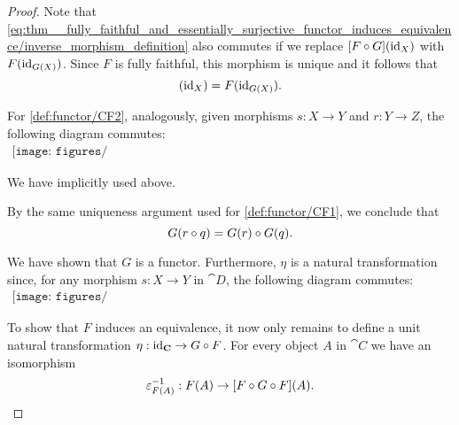 \begin{proof}
  Note that \eqref{eq:thm__fully_faithful_and_essentially_surjective_functor_induces_equivalence/inverse_morphism_definition} also commutes if we replace \( [F \bincirc G](\id_X) \) with \( F(\operatorname{id}_{G(X)}) \). Since \( F \) is fully faithful, this morphism is unique and it follows that
  \begin{equation*}
    [F \bincirc G](\id_X) = F(\id_{G(X)}).
  \end{equation*}

  For \ref{def:functor/CF2}, analogously, given morphisms \( s: X \to Y \) and \( r: Y \to Z \), the following diagram commutes:
  \begin{equation}\label{eq:thm__fully_faithful_and_essentially_surjective_functor_induces_equivalence/composition}
    \begin{aligned}
      \texttt{[image: figures/thm\_\_fully\_faithful\_and\_essentially\_surjective\_functor\_induces\_equivalence.pdf]}
    \end{aligned}
  \end{equation}

  We have implicitly used  above.

  By the same uniqueness argument used for \ref{def:functor/CF1}, we conclude that
  \begin{equation*}
    G(r \bincirc q) = G(r) \bincirc G(q).
  \end{equation*}

  We have shown that \( G \) is a functor. Furthermore, \( \eta \) is a natural transformation since, for any morphism \( s: X \to Y \) in \( \cat{D} \), the following diagram commutes:
  \begin{equation}\label{eq:thm__fully_faithful_and_essentially_surjective_functor_induces_equivalence/varepsilon}
    \begin{aligned}
      \texttt{[image: figures/thm\_\_fully\_faithful\_and\_essentially\_surjective\_functor\_induces\_equivalence.pdf]}
    \end{aligned}
  \end{equation}

  To show that \( F \) induces an equivalence, it now only remains to define a unit natural transformation \( \eta: \id_{\cat{C}} \to G \bincirc F \). For every object \( A \) in \( \cat{C} \) we have an isomorphism
  \begin{equation*}
    \varepsilon_{F(A)}^{-1}: F(A) \to [F \bincirc G \bincirc F](A).
  \end{equation*}


\end{proof}
